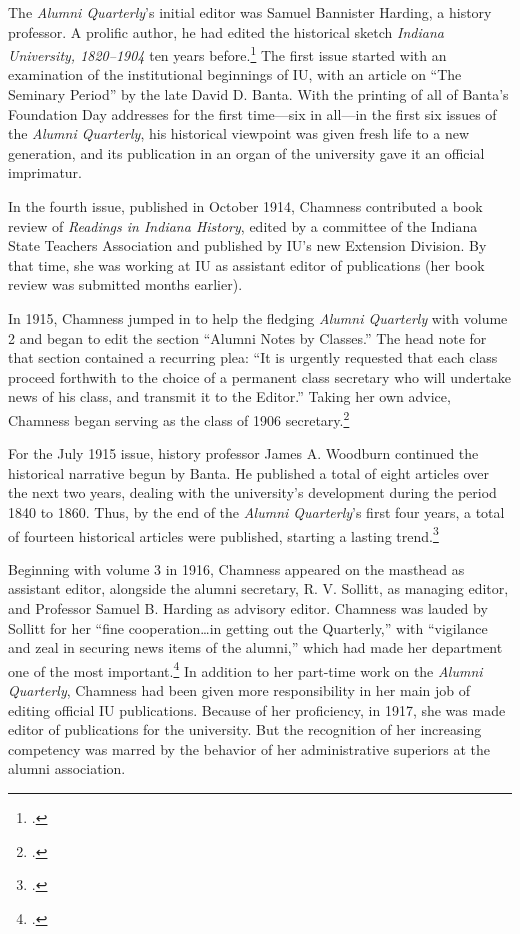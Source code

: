 \documentclass[
  american,
  letterpaper,
]{scrreprt}
\begin{document}
The \emph{Alumni Quarterly}'s initial editor was Samuel Bannister
Harding, a history professor. A prolific author, he had edited the
historical sketch \emph{Indiana University, 1820--1904} ten years
before.\footnote{.} The first issue started with an examination of the
institutional beginnings of IU, with an article on ``The Seminary
Period'' by the late David D. Banta. With the printing of all of Banta's
Foundation Day addresses for the first time---six in all---in the first
six issues of the \emph{Alumni Quarterly}, his historical viewpoint was
given fresh life to a new generation, and its publication in an organ of
the university gave it an official imprimatur.

In the fourth issue, published in October 1914, Chamness contributed a
book review of \emph{Readings in Indiana History}, edited by a committee
of the Indiana State Teachers Association and published by IU's new
Extension Division. By that time, she was working at IU as assistant
editor of publications (her book review was submitted months earlier).

In 1915, Chamness jumped in to help the fledging \emph{Alumni Quarterly}
with volume 2 and began to edit the section ``Alumni Notes by Classes.''
The head note for that section contained a recurring plea: ``It is
urgently requested that each class proceed forthwith to the choice of a
permanent class secretary who will undertake news of his class, and
transmit it to the Editor.'' Taking her own advice, Chamness began
serving as the class of 1906 secretary.\footnote{.}

For the July 1915 issue, history professor James A. Woodburn continued
the historical narrative begun by Banta. He published a total of eight
articles over the next two years, dealing with the university's
development during the period 1840 to 1860. Thus, by the end of the
\emph{Alumni Quarterly}'s first four years, a total of fourteen
historical articles were published, starting a lasting trend.\footnote{.}

Beginning with volume 3 in 1916, Chamness appeared on the masthead as
assistant editor, alongside the alumni secretary, R. V. Sollitt, as
managing editor, and Professor Samuel B. Harding as advisory editor.
Chamness was lauded by Sollitt for her ``fine cooperation\ldots in
getting out the Quarterly,'' with ``vigilance and zeal in securing news
items of the alumni,'' which had made her department one of the most
important.\footnote{.} In addition to her part-time work on the \emph{Alumni
Quarterly}, Chamness had been given more responsibility in her main job
of editing official IU publications. Because of her proficiency, in
1917, she was made editor of publications for the university. But the
recognition of her increasing competency was marred by the behavior of
her administrative superiors at the alumni association.
\end{document}
